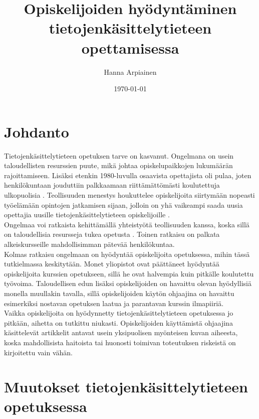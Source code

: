 \documentclass[finnish]{tktltiki2}
\title{﻿Opiskelijoiden hyödyntäminen tietojenkäsittelytieteen opettamisessa}
\author{Hanna Arpiainen}
\date{\today}
\theoremstyle{definition}
\theoremstyle{remark}
\begin{document}
\maketitle
\makeabstract

\tableofcontents
\newpage





\section{Johdanto}
Tietojenkäsittelytieteen opetuksen tarve on kasvanut. Ongelmana on usein taloudellisten resurssien puute, mikä johtaa opiskelupaikkojen lukumäärän rajoittamiseen. Lisäksi etenkin 1980-luvulla osaavista opettajista oli pulaa, joten henkilökuntaan jouduttiin palkkaamaan riittämättömästi koulutettuja ulkopuolisia \cite{Roberts11}. Teollisuuden menestys houkuttelee opiskelijoita siirtymään nopeasti työelämään opintojen jatkamisen sijaan, jolloin on yhä vaikeampi saada uusia opettajia uusille tietojenkäsittelytieteen opiskelijoille \cite{Roberts99}.
\\
Ongelmaa voi ratkaista kehittämällä yhteistyötä teollisuuden kanssa, koska sillä on taloudellisia resursseja tukea opetusta \cite{Roberts11}. Toinen ratkaisu on palkata alkeiskursseille mahdollisimman pätevää henkilökuntaa. 
\\
Kolmas ratkaisu ongelmaan on hyödyntää opiskelijoita opetuksessa, mihin tässä tutkielmassa keskitytään. Monet yliopistot ovat päättäneet hyödyntää opiskelijoita kurssien opetukseen, sillä he ovat halvempia kuin pitkälle koulutettu työvoima. Taloudellisen edun lisäksi opiskelijoiden on havaittu olevan hyödyllisiä monella muullakin tavalla, sillä opiskelijoiden käytön ohjaajina on havaittu esimerkiksi nostavan opetuksen laatua ja parantavan kurssin ilmapiiriä.
\\
Vaikka opiskelijoita on hyödynnetty tietojenkäsittelytieteen opetuksessa jo pitkään, aihetta on tutkittu niukasti. Opiskelijoiden käyttämistä ohjaajina käsittelevät artikkelit antavat usein yksipuolisen myönteisen kuvan aiheesta, koska mahdollisista haitoista tai huonosti toimivan toteutuksen riskeistä on kirjoitettu vain vähän. 


\section{Muutokset tietojenkäsittelytieteen opetuksessa}
\end{document}
